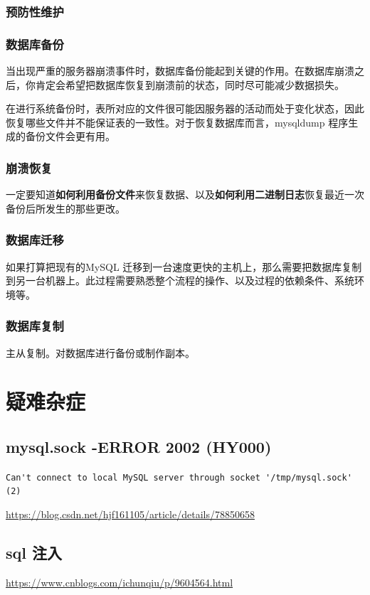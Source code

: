 \documentclass[UTF8,a4paper,12pt]{ctexbook}
\begin{document}
		\subsection{预防性维护}
		
		\subsection{数据库备份}
			当出现严重的服务器崩溃事件时，数据库备份能起到关键的作用。在数据库崩溃之后，你肯定会希望把数据库恢复到崩溃前的状态，同时尽可能减少数据损失。
			
			在进行系统备份时，表所对应的文件很可能因服务器的活动而处于变化状态，因此恢复哪些文件并不能保证表的一致性。对于恢复数据库而言，mysqldump 程序生成的备份文件会更有用。
			
		\subsection{崩溃恢复}
			一定要知道\textbf{如何利用备份文件}来恢复数据、以及\textbf{如何利用二进制日志}恢复最近一次备份后所发生的那些更改。
			
		\subsection{数据库迁移}
			如果打算把现有的MySQL 迁移到一台速度更快的主机上，那么需要把数据库复制到另一台机器上。此过程需要熟悉整个流程的操作、以及过程的依赖条件、系统环境等。
			
		\subsection{数据库复制}
			主从复制。对数据库进行备份或制作副本。
		
\chapter{疑难杂症}
	\section{mysql.sock -ERROR 2002 (HY000)}
		
		\verb|Can't connect to local MySQL server through socket '/tmp/mysql.sock' (2)|
		
		\url{https://blog.csdn.net/hjf161105/article/details/78850658}
	
	\section{sql 注入}
		\url{https://www.cnblogs.com/ichunqiu/p/9604564.html}
		
\end{document}
